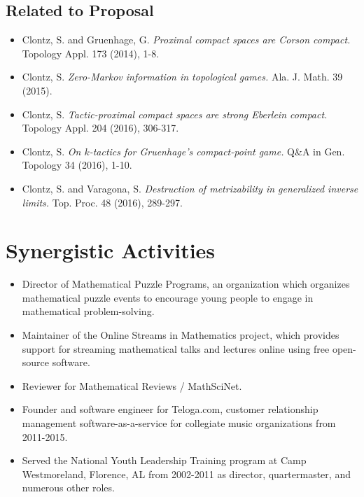 \subsection{Related to Proposal}

\begin{itemize}
  \item Clontz, S. and Gruenhage, G.
    \textit{Proximal compact spaces are Corson compact.}
    Topology Appl. 173 (2014), 1-8.
  \item Clontz, S.
    \textit{Zero-Markov information in topological games.}
    Ala. J. Math. 39 (2015).
  \item Clontz, S.
    \textit{Tactic-proximal compact spaces are strong Eberlein compact.}
    Topology Appl. 204 (2016), 306-317.
  \item Clontz, S.
    \textit{On \(k\)-tactics for Gruenhage's compact-point game.}
    Q\&A in Gen. Topology 34 (2016), 1-10.
  \item Clontz, S. and Varagona, S.
    \textit{Destruction of metrizability in generalized inverse limits.}
    Top. Proc. 48 (2016), 289-297.
\end{itemize}


\section{Synergistic Activities}

\begin{itemize}
  \item Director of Mathematical Puzzle Programs, an organization which
        organizes mathematical puzzle events to encourage young people to
        engage in mathematical problem-solving.
  \item Maintainer of the Online Streams in Mathematics project, which
        provides support for streaming mathematical talks and lectures online
        using free open-source software.
  \item Reviewer for Mathematical Reviews / MathSciNet.
  \item Founder and software engineer for Teloga.com, customer relationship
        management software-as-a-service for collegiate music organizations
        from 2011-2015.
  \item Served the National Youth Leadership Training program at Camp Westmoreland,
        Florence, AL from 2002-2011 as director, quartermaster, and
        numerous other roles.
\end{itemize}

